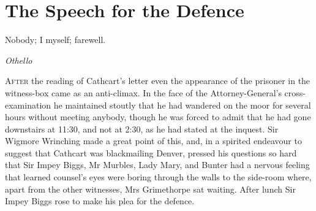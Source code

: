 

\chapter{The Speech for the Defence}

\epigraph{Nobody; I myself; farewell.}{\textit{Othello}}



\lettrine[lines=4]{A}{fter} the reading of Cathcart's letter even the appearance of the prisoner in the witness-box came as an anti-climax. In the face of the Attorney-General's cross-examination he maintained stoutly that he had wandered on the moor for several hours without meeting anybody, though he was forced to admit that he had gone downstairs at 11:30, and not at 2:30, as he had stated at the inquest. Sir Wigmore Wrinching made a great point of this, and, in a spirited endeavour to suggest that Cathcart was blackmailing Denver, pressed his questions so hard that Sir Impey Biggs, Mr Murbles, Lady Mary, and Bunter had a nervous feeling that learned counsel's eyes were boring through the walls to the side-room where, apart from the other witnesses, Mrs Grimethorpe sat waiting. After lunch Sir Impey Biggs rose to make his plea for the defence.

